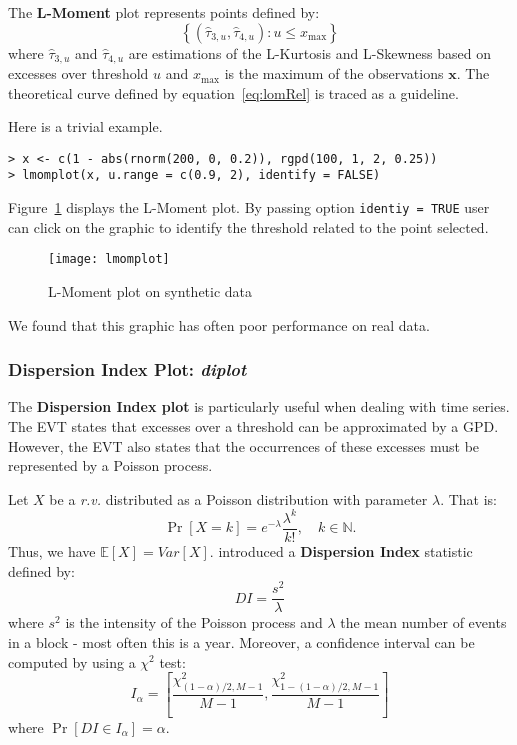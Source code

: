 \documentclass[11pt,a4paper]{article}
\numberwithin{equation}{section}
\theoremstyle{definition}
\begin{document}
The \textbf{L-Moment} plot represents points defined by:
\begin{equation}
  \label{eq:lmomplot}
  \left\{\left(\hat{\tau}_{3,u}, \hat{\tau}_{4,u}\right) : u \leq
    x_\mathrm{max} \right\}  
\end{equation}
where $\hat{\tau}_{3,u}$ and $\hat{\tau}_{4,u}$ are estimations of the
L-Kurtosis and L-Skewness based on excesses over threshold $u$ and
$x_\mathrm{max}$ is the maximum of the observations $\mathbf{x}$. The
theoretical curve defined by equation~\eqref{eq:lomRel} is traced as a
guideline.

Here is a trivial example.
\begin{verbatim}
> x <- c(1 - abs(rnorm(200, 0, 0.2)), rgpd(100, 1, 2, 0.25))
> lmomplot(x, u.range = c(0.9, 2), identify = FALSE)
\end{verbatim}

Figure~\ref{fig:lmomplot} displays the L-Moment plot. By passing
option \verb+identiy = TRUE+ user can click on the graphic to identify
the threshold related to the point selected.

\begin{figure}
  \centering
  \texttt{[image: lmomplot]}
  \caption{L-Moment plot on synthetic data}
  \label{fig:lmomplot}
\end{figure}

We found that this graphic has often poor performance on real data.

\subsubsection{Dispersion Index Plot: \emph{diplot}}

The \textbf{Dispersion Index plot} is particularly useful when dealing
with time series. The EVT states that excesses over a threshold can be
approximated by a GPD\@. However, the EVT also states that the
occurrences of these excesses must be represented by a Poisson
process.

Let $X$ be a \textit{r.v.} distributed as a Poisson distribution with
parameter $\lambda$. That is:
\begin{equation}
  \label{eq:poissLaw}
  \Pr\left[X = k\right] = e^{-\lambda} \frac{\lambda^k}{k!}, \quad k
  \in \mathbb{N}.
\end{equation}
Thus, we have $\mathbb{E}\left[X\right] =
Var\left[X\right]$. \citet{Cunnane1979} introduced a
\textbf{Dispersion Index} statistic defined by:
\begin{equation}
  \label{eq:DI}
  DI = \frac{s^2}{\lambda}
\end{equation}
where $s^2$ is the intensity of the Poisson process and $\lambda$ the
mean number of events in a block - most often this is a
year. Moreover, a confidence interval can be computed by using a
$\chi^2$ test:
\begin{equation}
  \label{eq:confDI}
   I_{\alpha} = \left[ \frac{\chi^2_{\left(1 - \alpha\right) / 2,
        M-1}}{M-1}, \frac{\chi^2_{1 - \left( 1 -\alpha\right) / 2,
        M-1}}{M-1} \right]
\end{equation}
where $\Pr\left[ DI \in I_{\alpha} \right] = \alpha$.
\end{document}
